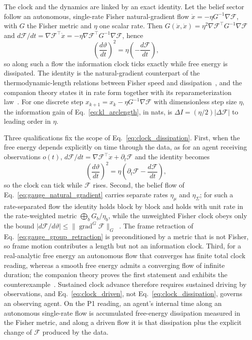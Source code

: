 \documentclass[11pt]{article}
\begin{document}
The clock and the dynamics are linked by an exact identity. Let the belief sector follow an autonomous, single-rate Fisher natural-gradient flow $\dot{x} = -\eta G^{-1}\nabla\mathcal{F}$, with $G$ the Fisher metric and $\eta$ one scalar rate. Then $G(\dot{x}, \dot{x}) = \eta^2 \nabla\mathcal{F}^\top G^{-1}\nabla\mathcal{F}$ and $d\mathcal{F}/dt = \nabla\mathcal{F}^\top \dot{x} = -\eta \nabla\mathcal{F}^\top G^{-1}\nabla\mathcal{F}$, hence
\begin{equation}
\left(\frac{d\vartheta}{dt}\right)^2 = \eta\left(-\frac{d\mathcal{F}}{dt}\right),
\label{eq:clock_dissipation}
\end{equation}
so along such a flow the information clock ticks exactly while free energy is dissipated. The identity is the natural-gradient counterpart of the thermodynamic-length relations between Fisher speed and dissipation~\cite{SalamonBerry1983, Crooks2007, Ito2018}, and the companion theory states it in rate form together with its reparameterization law~\cite[Ch.~7]{DennisGaugeVFE2026}. For one discrete step $x_{k+1} = x_k - \eta G^{-1}\nabla\mathcal{F}$ with dimensionless step size $\eta$, the information gain of Eq.~\eqref{eq:kl_arclength}, in nats, is $\Delta I = (\eta/2)|\Delta\mathcal{F}|$ to leading order in $\eta$.

Three qualifications fix the scope of Eq.~\eqref{eq:clock_dissipation}. First, when the free energy depends explicitly on time through the data, as for an agent receiving observations $o(t)$, $d\mathcal{F}/dt = \nabla\mathcal{F}^\top\dot{x} + \partial_t\mathcal{F}$ and the identity becomes
\begin{equation}
\left(\frac{d\vartheta}{dt}\right)^2 = \eta\left(\partial_t\mathcal{F} - \frac{d\mathcal{F}}{dt}\right),
\label{eq:clock_driven}
\end{equation}
so the clock can tick while $\mathcal{F}$ rises. Second, the belief flow of Eq.~\eqref{eq:gauge_natural_gradient} carries separate rates $\eta_\mu$ and $\eta_\Sigma$; for such a rate-separated flow the identity holds block by block and holds with unit rate in the rate-weighted metric $\bigoplus_b G_b/\eta_b$, while the unweighted Fisher clock obeys only the bound $|d\mathcal{F}/d\vartheta| \le \|\operatorname{grad}^{G}\mathcal{F}\|_{G}$~\cite[Chs.~7 and~8]{DennisGaugeVFE2026}. The frame retraction of Eq.~\eqref{eq:gauge_group_retraction} is preconditioned by a metric that is not Fisher, so frame motion contributes a length but not an information clock. Third, for a real-analytic free energy an autonomous flow that converges has finite total clock reading, whereas a smooth free energy admits a converging flow of infinite duration; the companion theory proves the first statement and exhibits the counterexample~\cite[Ch.~7]{DennisGaugeVFE2026}. Sustained clock advance therefore requires sustained driving by observations, and Eq.~\eqref{eq:clock_driven}, not Eq.~\eqref{eq:clock_dissipation}, governs an observing agent. On the P1 reading, an agent's internal time along an autonomous single-rate flow is accumulated free-energy dissipation measured in the Fisher metric, and along a driven flow it is that dissipation plus the explicit change of $\mathcal{F}$ produced by the data.
\end{document}
